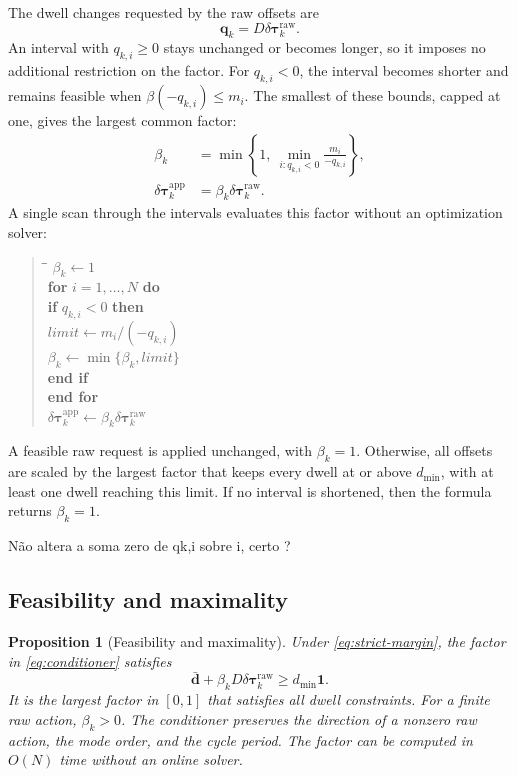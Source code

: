 \documentclass[pdflatex,iicol,sn-mathphys-ay]{sn-jnl}
\newtheorem{proposition}{Proposition}
\newcommand{\vect}[1]{\bm{#1}}
\newcommand{\dtau}{\delta\vect{\tau}}
\newcommand{\red}[1]{{\color{red}#1}}
\begin{document}
The dwell changes requested by the raw offsets are
\[
    \vect{q}_k=D\dtau_k^{\mathrm{raw}}.
\]
An interval with $q_{k,i}\ge0$ stays unchanged or becomes longer, so it imposes no additional restriction on the factor. For $q_{k,i}<0$, the interval becomes shorter and remains feasible when $\beta(-q_{k,i})\le m_i$. The smallest of these bounds, capped at one, gives the largest common factor:
\begin{equation}
\begin{aligned}
    \beta_k&=\min\left\{1,\ \min_{i:q_{k,i}<0}\frac{m_i}{-q_{k,i}}\right\},\\
    \dtau_k^{\mathrm{app}}&=\beta_k\dtau_k^{\mathrm{raw}}.
\end{aligned}
\label{eq:conditioner}
\end{equation}
A single scan through the intervals evaluates this factor without an optimization solver:
\begin{quote}
\begin{tabbing}
\hspace{1em}\=\hspace{1em}\=\kill
$\beta_k\gets1$ \\
\textbf{for} $i=1,\ldots,N$ \textbf{do} \\
\>\textbf{if} $q_{k,i}<0$ \textbf{then} \\
\>\>$\mathit{limit}\gets m_i/(-q_{k,i})$ \\
\>\>$\beta_k\gets\min\{\beta_k,\mathit{limit}\}$ \\
\>\textbf{end if} \\
\textbf{end for} \\
$\dtau_k^{\mathrm{app}}\gets\beta_k\dtau_k^{\mathrm{raw}}$
\end{tabbing}
\end{quote}
A feasible raw request is applied unchanged, with $\beta_k=1$. Otherwise, all offsets are scaled by the largest factor that keeps every dwell at or above $d_{\min}$, with at least one dwell reaching this limit. If no interval is shortened, then the formula returns $\beta_k=1$.

\red{Não altera a soma zero de qk,i sobre i, certo ?}

\subsection{Feasibility and maximality}

\begin{proposition}[Feasibility and maximality]
\label{prop:conditioner}
Under \eqref{eq:strict-margin}, the factor in \eqref{eq:conditioner} satisfies
\[
    \bar{\vect{d}}+\beta_k D\dtau_k^{\mathrm{raw}}\ge d_{\min}\vect{1}.
\]
It is the largest factor in $[0,1]$ that satisfies all dwell constraints. For a finite raw action, $\beta_k>0$. The conditioner preserves the direction of a nonzero raw action, the mode order, and the cycle period. The factor can be computed in $O(N)$ time without an online solver.
\end{proposition}
\end{document}
